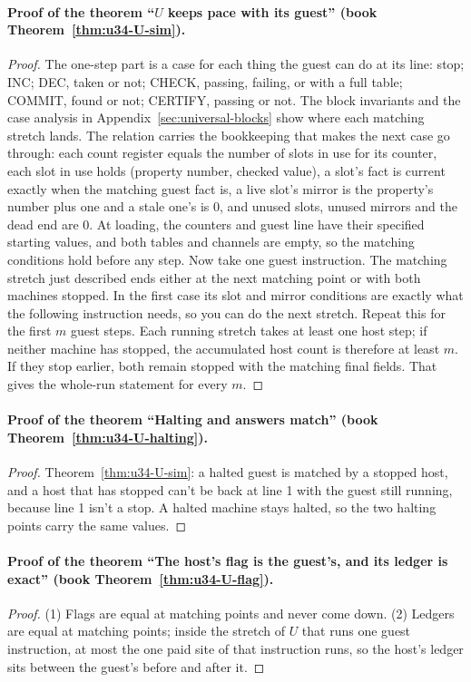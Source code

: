 \documentclass[11pt,twoside]{article}
\theoremstyle{thielethm}
\theoremstyle{thieledef}
\theoremstyle{thieledef}
\theoremstyle{thieledef}
\theoremstyle{thielethm}
\theoremstyle{thieleobs}
\theoremstyle{thielethm}
\begin{document}
\paragraph{Proof of the theorem ``$U$ keeps pace with its guest'' (book Theorem~\ref{thm:u34-U-sim}).}
\begin{proof}
The one-step part is a case for each thing the guest can do at its line: stop; INC; DEC, taken or
not; CHECK, passing, failing, or with a full table; COMMIT, found or not; CERTIFY, passing or not.
The block invariants and the case analysis in Appendix~\ref{sec:universal-blocks}
show where each matching stretch lands. The relation carries
the bookkeeping that makes the next case go through: each count register equals the number of
slots in use for its counter, each slot in use holds (property number, checked value), a slot's
fact is current exactly when the matching guest fact is, a live slot's mirror is the property's
number plus one and a stale one's is 0, and unused slots, unused mirrors and the dead end are 0.
At loading, the counters and guest line have their specified starting values,
and both tables and channels are empty, so the matching conditions hold before
any step. Now take one guest instruction. The matching stretch just described
ends either at the next matching point or with both machines stopped. In the
first case its slot and mirror conditions are exactly what the following
instruction needs, so you can do the next stretch. Repeat this for the first
$m$ guest steps. Each running stretch takes at least one host step; if neither
machine has stopped, the accumulated host count is therefore at least $m$.
If they stop earlier, both remain stopped with the matching final fields.
That gives the whole-run statement for every $m$.
\end{proof}

\paragraph{Proof of the theorem ``Halting and answers match'' (book Theorem~\ref{thm:u34-U-halting}).}
\begin{proof}
Theorem~\ref{thm:u34-U-sim}: a halted guest is matched by a stopped host, and a host that has
stopped can't be back at line 1 with the guest still running, because line 1 isn't a stop. A
halted machine stays halted, so the two halting points carry the same values.
\end{proof}

\paragraph{Proof of the theorem ``The host's flag is the guest's, and its ledger is exact'' (book Theorem~\ref{thm:u34-U-flag}).}
\begin{proof}
(1) Flags are equal at matching points and never come down. (2) Ledgers are equal at matching
points; inside the stretch of $U$ that runs one guest instruction, at most the one paid site of
that instruction runs, so the host's ledger sits between the guest's before and after it.
\end{proof}
\end{document}
